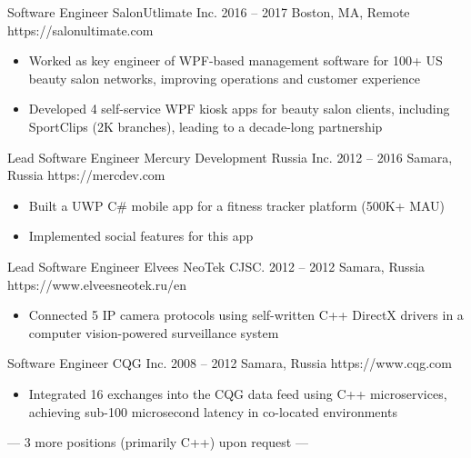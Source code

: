 \documentclass[9pt,a4paper]{juicv}
\begin{document}
\begin{paracol}{2}
    \cvLeftEvent
        {Software Engineer}
        {SalonUtlimate Inc.}
        {2016 -- 2017}
        {Boston, MA, Remote}
        {https://salonultimate.com}

        \begin{itemize}
            \item Worked as key engineer of WPF-based management software
                  for 100+ US beauty salon networks, improving operations and customer experience
            \item Developed 4 self-service WPF kiosk apps for beauty salon clients,
                  including SportClips (2K branches), leading to a decade-long partnership
        \end{itemize}

    \cvLeftEvent
        {Lead Software Engineer}
        {Mercury Development Russia Inc.}
        {2012 -- 2016}
        {Samara, Russia}
        {https://mercdev.com}

        \begin{itemize}
            \item Built a UWP C\# mobile app for a fitness tracker platform (500K+ MAU)
            \item Implemented social features for this app
        \end{itemize}

    \cvLeftEvent
        {Lead Software Engineer}
        {Elvees NeoTek CJSC.}
        {2012 -- 2012}
        {Samara, Russia}
        {https://www.elveesneotek.ru/en}

        \begin{itemize}
            \item Connected 5 IP camera protocols using self-written C++ DirectX drivers
                  in a computer vision-powered surveillance system
        \end{itemize}

    \cvLeftEvent
        {Software Engineer}
        {CQG Inc.}
        {2008 -- 2012}
        {Samara, Russia}
        {https://www.cqg.com}

        \begin{itemize}
            \item Integrated 16 exchanges into the CQG data feed using C++ microservices,
                  achieving sub-100 microsecond latency in co-located environments
        \end{itemize}

        \vspace{6pt}
        \centerline{%
            \footnotesize
            \color{secondaryTextColor}
            --- 3 more positions (primarily C++) upon request ---
        }%


\end{paracol}
\end{document}
